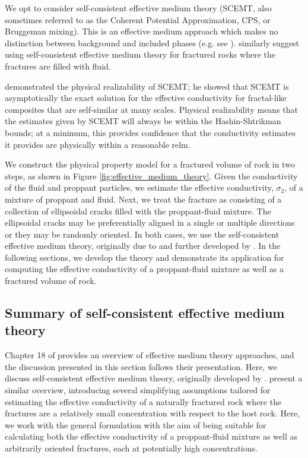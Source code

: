 We opt to consider self-consistent effective medium theory (SCEMT, also sometimes referred to as the Coherent Potential Approximation, CPS, or Bruggeman mixing). This is an effective medium approach which makes no distinction between background and included phases (e.g. see \cite{Torquato2002}). \cite{Berryman2013} similarly suggest using self-consistent effective medium theory for fractured rocks where the fractures are filled with fluid.

\cite{Milton1985} demonstrated the physical realizability of SCEMT; he showed that SCEMT is asymptotically the exact solution for the effective conductivity for fractal-like composites that are self-similar at many scales. Physical realizability means that the estimates given by SCEMT will always be within the Hashin-Shtrikman bounds; at a minimum, this provides confidence that the conductivity estimates it provides are physically within a reasonable relm.

We construct the physical property model for a fractured volume of rock in two steps, as shown in Figure \ref{fig:effective_medium_theory}. Given the conductivity of the fluid and proppant particles, we estimate the effective conductivity, $\sigma_2$, of a mixture of proppant and fluid. Next, we treat the fracture as consisting of a collection of ellipsoidal cracks filled with the proppant-fluid mixture. The ellipsoidal cracks may be preferentially aligned in a single or multiple directions or they may be randomly oriented. In both cases, we use the self-consistent effective medium theory, originally due to \cite{Bruggeman1935} and further developed by \cite{Landauer1952, Landauer1978}. In the following sections, we develop the theory and demonstrate its application for computing the effective conductivity of a proppant-fluid mixture as well as a fractured volume of rock.






\subsection{Summary of self-consistent effective medium theory}
\label{sect:emt_math}

Chapter 18 of \cite{Torquato2002} provides an overview of effective medium theory approaches, and the discussion presented in this section follows their presentation. Here, we discuss self-consistent effective medium theory, originally developed by \cite{Bruggeman1935}. \cite{Berryman2013} present a similar overview, introducing several simplifying assumptions tailored for estimating the effective conductivity of a naturally fractured rock where the fractures are a relatively small concentration with respect to the host rock. Here, we work with the general formulation with the aim of being suitable for calculating both the effective conductivity of a proppant-fluid mixture as well as arbitrarily oriented fractures, each at potentially high concentrations.

